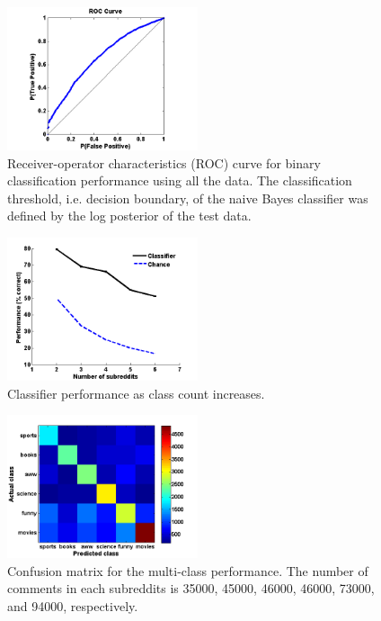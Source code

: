 \documentclass[10pt,twocolumn]{article}
\begin{document}
\begin{figure}
    \centering
  	\includegraphics[width=0.5\textwidth]{./roc.png}
  	\caption{Receiver-operator characteristics (ROC) curve for binary classification performance using all the data. The classification threshold, i.e. decision boundary, of the naive Bayes classifier was defined by the log posterior of the test data.}
  	\label{roc}
\end{figure}		

\begin{figure}
    \centering
  	\includegraphics[width=0.5\textwidth]{./varyWBaseline.png}
  	\caption{Classifier performance as class count increases.}
  	\label{classes}
\end{figure}	

\begin{figure}
    \centering
  	\includegraphics[width=0.5\textwidth]{./confusion_mat.png}
  	\caption{Confusion matrix for the multi-class performance. The number of comments in each subreddits is 35000, 45000, 46000, 46000, 73000, and 94000, respectively.}
  	\label{confusion}
\end{figure}	
\end{document}

